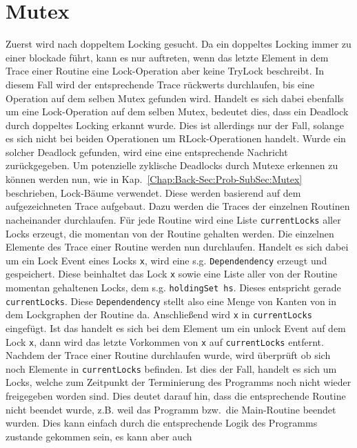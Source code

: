 \section{Mutex} \label{Chap:Implement-Sec:Mutex}
Zuerst wird nach doppeltem Locking gesucht. Da ein doppeltes Locking immer 
zu einer blockade führt, kann es nur auftreten, wenn das letzte Element in 
dem Trace einer Routine eine Lock-Operation aber keine TryLock beschreibt. In diesem Fall wird 
der entsprechende Trace rückwerts durchlaufen, bis eine Operation auf dem 
selben Mutex gefunden wird. Handelt es sich dabei ebenfalls um eine 
Lock-Operation auf dem selben Mutex, bedeutet dies, dass ein Deadlock durch 
doppeltes Locking erkannt wurde. Dies ist allerdings nur der Fall, solange es 
sich nicht bei beiden Operationen um RLock-Operationen handelt. Wurde ein 
solcher Deadlock gefunden, wird eine eine entsprechende Nachricht zurückgegeben. 
Um potenzielle zyklische Deadlocks durch Mutexe erkennen zu können werden nun, wie in 
Kap.~\ref{Chap:Back-Sec:Prob-SubSec:Mutex} beschrieben, Lock-Bäume verwendet.
Diese werden basierend auf dem aufgezeichneten Trace aufgebaut. Dazu werden die Traces der 
einzelnen Routinen nacheinander durchlaufen. Für jede Routine wird eine Liste \texttt{currentLocks} aller 
Locks erzeugt, die momentan von der Routine gehalten werden. Die einzelnen Elemente des Trace einer 
Routine werden nun durchlaufen. Handelt es sich dabei um ein Lock Event eines Locks \texttt{x}, 
wird eine s.g. \texttt{Dependendency} erzeugt und gespeichert. Diese beinhaltet 
das Lock \texttt{x} sowie eine Liste aller von der Routine momentan gehaltenen 
Locks, dem s.g. \texttt{holdingSet hs}. Dieses entspricht gerade \texttt{currentLocks}. 
Diese \texttt{Dependendency} stellt also 
eine Menge von Kanten von in dem Lockgraphen der Routine da. 
Anschließend wird \texttt{x} in \texttt{currentLocks} eingefügt.
Ist das handelt es sich bei dem Element um ein unlock Event auf dem Lock \texttt{x}, dann wird das 
letzte Vorkommen von \texttt{x} auf \texttt{currentLocks} entfernt.\\
Nachdem der Trace einer Routine durchlaufen wurde, wird überprüft ob sich noch Elemente in 
\texttt{currentLocks} befinden. Ist dies der Fall, handelt es sich um Locks, welche zum Zeitpunkt der Terminierung 
des Programms noch nicht wieder freigegeben worden sind. Dies deutet darauf hin, dass die
entsprechende Routine nicht beendet wurde, z.B. weil das Programm bzw.\ die Main-Routine beendet wurden.
Dies kann einfach durch die entsprechende Logik des Programms zustande gekommen sein, es kann aber auch 
